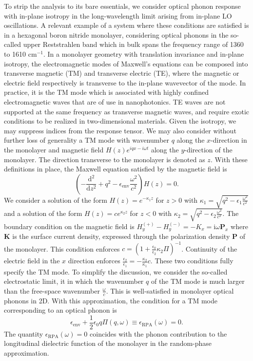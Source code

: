 \documentclass[aps,prb,twocolumn,
	groupedaddress,superscriptaddress,
	amsfonts,amssymb,amsmath,floatfix,
	citeautoscript]{revtex4-1}
\newcommand{\iu}{\mathrm{i}}
\newcommand{\dd}{\mathrm{d}}
\begin{document}
To strip the analysis to its bare essentials, we consider optical phonon response with in-plane isotropy in the long-wavelength limit arising from in-plane LO oscillations. A relevant example of a system where these conditions are satisfied is in a hexagonal boron nitride monolayer, considering optical phonons in the so-called upper Reststrahlen band which in bulk spans the frequency range of 1360 to 1610 cm$^{-1}$. In a monolayer geometry with translation invariance and in-plane isotropy, the electromagnetic modes of Maxwell's equations can be composed into transverse magnetic (TM) and transverse electric (TE), where the magnetic or electric field respectively is transverse to the in-plane wavevector of the mode. In practice, it is the TM mode which is associated with highly confined electromagnetic waves that are of use in nanophotonics. TE waves are not supported at the same frequency as transverse magnetic waves, and require exotic conditions to be realized in two-dimensional materials. Given the isotropy, we may suppress indices from the response tensor. We may also consider without further loss of generality a TM mode with wavenumber $q$ along the $x$-direction in the monolayer and magnetic field $H(z)e^{iqx-i\omega t}$ along the $y$-direction of the monolayer. The direction transverse to the monolayer is denoted as $z$.  With these definitions in place, the Maxwell equation satisfied by the magnetic field is \begin{equation}\label{eq:2dmaxwell}
\left(-\frac{\dd^2}{\dd{}z^2}+q^2-\epsilon_{\mathrm{env}}\frac{\omega^2}{c^2} \right)H(z) = 0.
\end{equation}
We consider a solution of the form $H(z) = e^{-\kappa_1 z}$ for $z > 0$ with $\kappa_1 = \sqrt{q^2-\epsilon_1\frac{\omega^2}{c^2}}$ and a solution of the form $H(z) = ce^{\kappa_2 z}$ for $z < 0$ with $\kappa_2 = \sqrt{q^2-\epsilon_2\frac{\omega^2}{c^2}}$. The boundary condition on the magnetic field is $H_y^{(+)}-H_y^{(-)} = -K_x = \iu\omega\mathbf{P}_x$ where $\mathbf{K}$ is the surface current density, expressed through the polarization density $\mathbf{P}$ of the monolayer. This condition enforces $c =(1+\frac{\epsilon_0}{\epsilon_2} \kappa_2\Pi)^{-1}$. Continuity of the electric field in the $x$ direction enforces $\frac{\epsilon_2}{\epsilon_1} = -\frac{\kappa_2}{\kappa_1}c$. These two conditions fully specify the TM mode. To simplify the discussion, we consider the so-called electrostatic limit, it in which the wavenumber $q$ of the TM mode is much larger than the free-space wavenumber $\frac{\omega}{c}$. This is well-satisfied in monolayer optical phonons in 2D. With this approximation, the condition for a TM mode corresponding to an optical phonon is
\begin{equation}
\epsilon_{\mathrm{env}} + \frac{1}{2}\epsilon_0 q \Pi(q,\omega) \equiv \epsilon_{\mathrm{RPA}}(\omega) = 0.
\end{equation}
The quantity $\epsilon_{\mathrm{RPA}}(\omega) = 0$ coincides with the phonon contribution to the longitudinal dielectric function of the monolayer in the random-phase approximation. 
\end{document}
